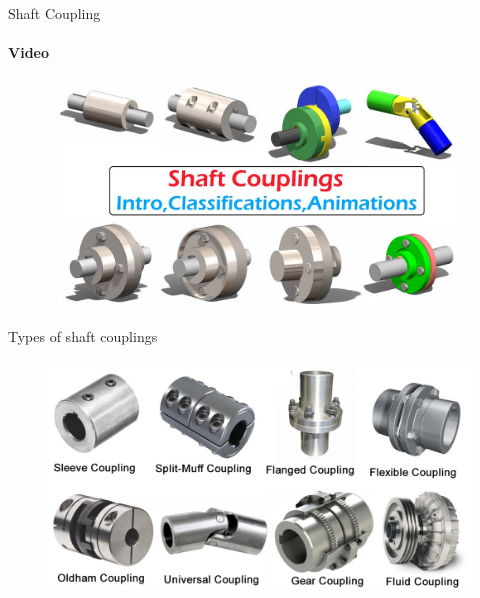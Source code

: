 \documentclass[aspectratio=169]{beamer}
\begin{document}
\begin{frame}[t]{Shaft Coupling}
    \framesubtitle{Video}
    \vspace{-0.6cm}
    \begin{figure}[H]
        \href{https://youtu.be/SPnTA3H2G7g}{
            \centering\includegraphics[height=6cm,width=1\textwidth,keepaspectratio]{shaft_coupling_video.jpg}}
        \label{fig:shaft_coupling_video.jpg}
    \end{figure}
\end{frame}

\begin{frame}[t]{Types of shaft couplings}
\framesubtitle{}
    \vspace{-0.6cm}
    \begin{figure}[H]
        \centering\includegraphics[height=6cm,width=1\textwidth,keepaspectratio]{couplings.jpeg}
        \label{fig:couplings.jpeg}
    \end{figure}
\end{frame}
\end{document}
